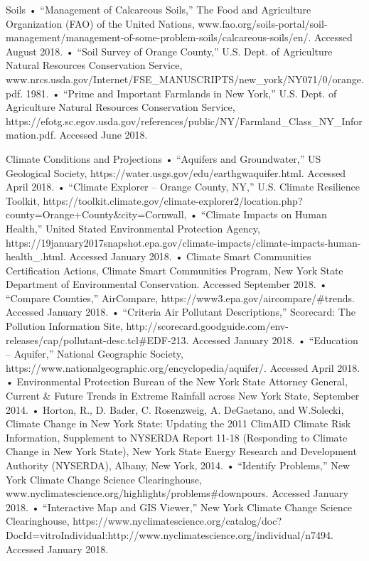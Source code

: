 Soils
    • “Management of Calcareous Soils,” The Food and Agriculture Organization (FAO) of the United Nations, www.fao.org/soils-portal/soil-management/management-of-some-problem-soils/calcareous-soils/en/. Accessed August 2018.
    • “Soil Survey of Orange County,” U.S. Dept. of Agriculture Natural Resources Conservation Service, www.nrcs.usda.gov/Internet/FSE_MANUSCRIPTS/new_york/NY071/0/orange.pdf. 1981.
    • “Prime and Important Farmlands in New York,” U.S. Dept. of Agriculture Natural Resources Conservation Service, https://efotg.sc.egov.usda.gov/references/public/NY/Farmland_Class_NY_Information.pdf. Accessed June 2018.

Climate Conditions and Projections
    • “Aquifers and Groundwater,” US Geological Society, https://water.usgs.gov/edu/earthgwaquifer.html. Accessed April 2018.
    • “Climate Explorer – Orange County, NY,” U.S. Climate Resilience Toolkit, https://toolkit.climate.gov/climate-explorer2/location.php?county=Orange+County&city=Cornwall,%
    • “Climate Impacts on Human Health,” United Stated Environmental Protection Agency, https://19january2017snapshot.epa.gov/climate-impacts/climate-impacts-human-health_.html. Accessed January 2018.
    • Climate Smart Communities Certification Actions, Climate Smart Communities Program, New York State Department of Environmental Conservation. Accessed September 2018.
    • “Compare Counties,” AirCompare, https://www3.epa.gov/aircompare/#trends. Accessed January 2018.
    • “Criteria Air Pollutant Descriptions,” Scorecard: The Pollution Information Site, http://scorecard.goodguide.com/env-releases/cap/pollutant-desc.tcl#EDF-213. Accessed January 2018.
    • “Education – Aquifer,” National Geographic Society, https://www.nationalgeographic.org/encyclopedia/aquifer/. Accessed April 2018.
    • Environmental Protection Bureau of the New York State Attorney General, Current & Future Trends in Extreme Rainfall across New York State, September 2014.
    • Horton, R., D. Bader, C. Rosenzweig, A. DeGaetano, and W.Solecki, Climate Change in New York State: Updating the 2011 ClimAID Climate Risk Information, Supplement to NYSERDA Report 11-18 (Responding to Climate Change in New York State), New York State Energy Research and Development Authority (NYSERDA), Albany, New York, 2014.
    • “Identify Problems,” New York Climate Change Science Clearinghouse, www.nyclimatescience.org/highlights/problems#downpours. Accessed January 2018.
    • “Interactive Map and GIS Viewer,” New York Climate Change Science Clearinghouse, https://www.nyclimatescience.org/catalog/doc?DocId=vitroIndividual:http://www.nyclimatescience.org/individual/n7494. Accessed January 2018.
